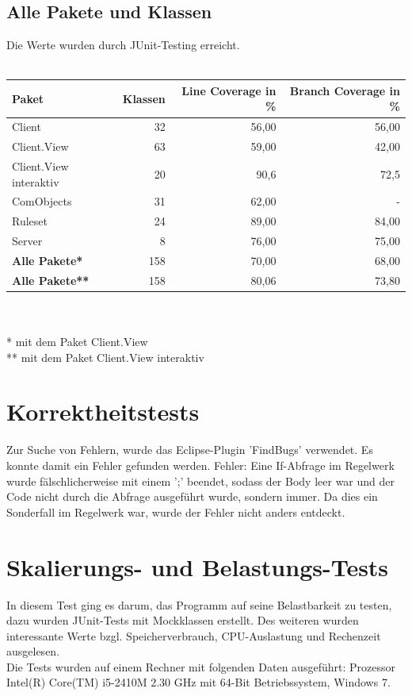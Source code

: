 \documentclass[a4paper]{article}
\begin{document}
	
	\subsection{Alle Pakete und Klassen}

	Die Werte wurden durch JUnit-Testing erreicht.
 \ \\ \ \\ 	
	\noindent
	\begin{tabular}{|l|r|r|r|} \hline
	Paket & Klassen & Line Coverage in \% & Branch Coverage in \% \\ \hline \hline

Client & 32 & 56,00 & 56,00 \\ \hline
Client.View & 63 & 59,00 & 42,00 \\ \hline
Client.View interaktiv & 20 & 90,6 & 72,5 \\ \hline
ComObjects & 31 & 62,00 & - \\ \hline
Ruleset & 24 & 89,00 & 84,00 \\ \hline
Server & 8 & 76,00 & 75,00 \\ \hline \hline
\textbf{Alle Pakete*} & 158 & 70,00 & 68,00 \\ \hline 
\textbf{Alle Pakete**} & 158 & 80,06 & 73,80 \\ \hline 
\end{tabular}
 \ \\ \ \\ 
\noindent
* mit dem Paket Client.View \\
** mit dem Paket Client.View interaktiv
	
	
\section{Korrektheitstests}
Zur Suche von Fehlern, wurde das Eclipse-Plugin 'FindBugs' verwendet. Es konnte damit ein Fehler gefunden werden.
Fehler: Eine If-Abfrage im Regelwerk wurde fälschlicherweise mit einem ';' beendet, sodass der Body leer war und der Code nicht durch die Abfrage ausgeführt wurde, sondern immer. Da dies ein Sonderfall im Regelwerk war, wurde der Fehler nicht anders entdeckt.


\section{Skalierungs- und Belastungs-Tests}

In diesem Test ging es darum, das Programm auf seine Belastbarkeit zu testen, dazu wurden JUnit-Tests mit Mockklassen erstellt. Des weiteren wurden interessante Werte bzgl. Speicherverbrauch, CPU-Auslastung und Rechenzeit ausgelesen.\\
Die Tests wurden auf einem Rechner mit folgenden Daten ausgeführt: Prozessor Intel(R) Core(TM) i5-2410M 2.30 GHz mit 64-Bit Betriebssystem, Windows 7.
\end{document}
